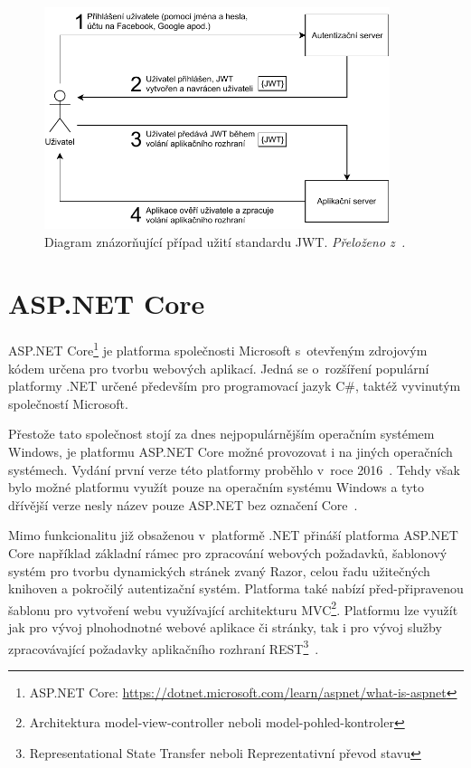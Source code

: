 \begin{figure}[H]
    \label{img:jwt}
	\centering
	\includegraphics[width=0.9\textwidth]{obrazky-figures/jwt.pdf}
	\caption{Diagram znázorňující případ užití standardu JWT. \emph{Přeloženo z~\cite{bib:jwt-steps}.}}
\end{figure}

\section{ASP.NET Core}
ASP.NET Core\footnote{ASP.NET Core: \url{https://dotnet.microsoft.com/learn/aspnet/what-is-aspnet}} je platforma společnosti Microsoft s~otevřeným zdrojovým kódem určena pro tvorbu webových aplikací. Jedná se o~rozšíření populární platformy .NET určené především pro programovací jazyk C\#, taktéž vyvinutým společností Microsoft.

Přestože tato společnost stojí za dnes nejpopulárnějším operačním systémem Windows, je platformu ASP.NET Core možné provozovat i na jiných operačních systémech. Vydání první verze této platformy proběhlo v~roce 2016~\cite{bib:asp-release}. Tehdy však bylo možné platformu využít pouze na operačním systému Windows a tyto dřívější verze nesly název pouze ASP.NET bez označení Core~\cite{bib:asp-what-is}.

Mimo funkcionalitu již obsaženou v~platformě .NET přináší platforma ASP.NET Core například základní rámec pro zpracování webových požadavků, šablonový systém pro tvorbu dynamických stránek zvaný Razor, celou řadu užitečných knihoven a pokročilý autentizační systém. Platforma také nabízí před-připravenou šablonu pro vytvoření webu využívající architekturu MVC\footnote{Architektura model-view-controller neboli model-pohled-kontroler}. Platformu lze využít jak pro vývoj plnohodnotné webové aplikace či stránky, tak i pro vývoj služby zpracovávající požadavky aplikačního rozhraní REST\footnote{Representational State Transfer neboli Reprezentativní převod stavu}~\cite{bib:asp-learn}.

